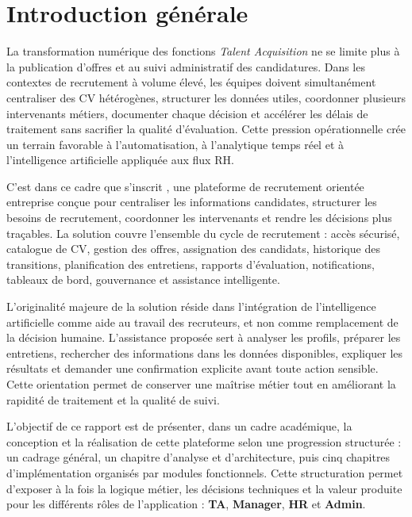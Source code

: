 \chapter*{Introduction générale}

La transformation numérique des fonctions \textit{Talent Acquisition} ne se limite plus à la publication d'offres et au suivi administratif des candidatures. Dans les contextes de recrutement à volume élevé, les équipes doivent simultanément centraliser des CV hétérogènes, structurer les données utiles, coordonner plusieurs intervenants métiers, documenter chaque décision et accélérer les délais de traitement sans sacrifier la qualité d'évaluation. Cette pression opérationnelle crée un terrain favorable à l'automatisation, à l'analytique temps réel et à l'intelligence artificielle appliquée aux flux RH.

C'est dans ce cadre que s'inscrit \projectname{}, une plateforme de recrutement orientée entreprise conçue pour centraliser les informations candidates, structurer les besoins de recrutement, coordonner les intervenants et rendre les décisions plus traçables. La solution couvre l'ensemble du cycle de recrutement : accès sécurisé, catalogue de CV, gestion des offres, assignation des candidats, historique des transitions, planification des entretiens, rapports d'évaluation, notifications, tableaux de bord, gouvernance et assistance intelligente.

L'originalité majeure de la solution réside dans l'intégration de l'intelligence artificielle comme aide au travail des recruteurs, et non comme remplacement de la décision humaine. L'assistance proposée sert à analyser les profils, préparer les entretiens, rechercher des informations dans les données disponibles, expliquer les résultats et demander une confirmation explicite avant toute action sensible. Cette orientation permet de conserver une maîtrise métier tout en améliorant la rapidité de traitement et la qualité de suivi.

L'objectif de ce rapport est de présenter, dans un cadre académique, la conception et la réalisation de cette plateforme selon une progression structurée : un cadrage général, un chapitre d'analyse et d'architecture, puis cinq chapitres d'implémentation organisés par modules fonctionnels. Cette structuration permet d'exposer à la fois la logique métier, les décisions techniques et la valeur produite pour les différents rôles de l'application : \textbf{TA}, \textbf{Manager}, \textbf{HR} et \textbf{Admin}.


